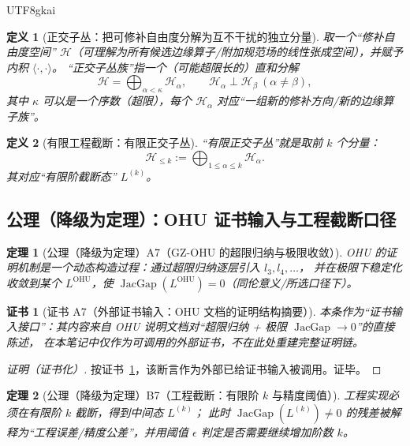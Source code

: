 \documentclass[12pt]{article}
\newtheorem{definition}{定义}[section]
\newtheorem{theorem}{定理}[section]
\newtheorem{Certificate}{证书}[section]
\newcommand{\JacGap}{\operatorname{JacGap}}
\begin{document}
\begin{CJK*}{UTF8}{gkai}
\begin{definition}[正交子丛：把可修补自由度分解为互不干扰的独立分量]
\label{def:tex27-ch7-d2}
取一个“修补自由度空间” $\mathcal{H}$（可理解为所有候选边缘算子/附加规范场的线性张成空间），并赋予内积 $\langle\cdot,\cdot\rangle$。
“正交子丛族”指一个（可能超限长的）直和分解
\[
  \mathcal{H}=\bigoplus_{\alpha<\kappa}\mathcal{H}_\alpha,
  \qquad
  \mathcal{H}_\alpha\perp \mathcal{H}_\beta\ (\alpha\neq\beta),
\]
其中 $\kappa$ 可以是一个序数（超限），每个 $\mathcal{H}_\alpha$ 对应“一组新的修补方向/新的边缘算子族”。
\end{definition}

\begin{definition}[有限工程截断：有限正交子丛]
\label{def:tex27-ch7-d3}
“有限正交子丛”就是取前 $k$ 个分量：
\[
  \mathcal{H}_{\le k}:=\bigoplus_{1\le \alpha\le k}\mathcal{H}_\alpha.
\]
其对应“有限阶截断态” $L^{(k)}$。
\end{definition}

\subsection{公理（降级为定理）：OHU 证书输入与工程截断口径}
\label{subsec:tex27-ch7-axioms}

\begin{theorem}[公理（降级为定理）A7（GZ-OHU 的超限归纳与极限收敛）]
\label{thm:tex27-ch7-a7}
OHU 的证明机制是一个动态构造过程：通过超限归纳逐层引入 $l_3,l_4,\dots$，
并在极限下稳定化收敛到某个 $L^{\mathrm{OHU}}$，使 $\JacGap(L^{\mathrm{OHU}})=0$（同伦意义/所选口径下）。
\end{theorem}

\begin{Certificate}[证书 A7（外部证书输入：OHU 文档的证明结构摘要）]
\label{cert:tex27-ch7-a7}
本条作为“证书输入接口”：其内容来自 OHU 说明文档对“超限归纳 + 极限 $\JacGap\to 0$”的直接陈述，
在本笔记中仅作为可调用的外部证书，不在此处重建完整证明链。
\cite{GaoZheng2025GFramework}
\end{Certificate}

\begin{proof}[证明（证书化）]
按证书~\ref{cert:tex27-ch7-a7}，该断言作为外部已给证书输入被调用。证毕。
\end{proof}

\begin{theorem}[公理（降级为定理）B7（工程截断：有限阶 $k$ 与精度阈值）]
\label{thm:tex27-ch7-b7}
工程实现必须在有限阶 $k$ 截断，得到中间态 $L^{(k)}$；
此时 $\JacGap(L^{(k)})\neq 0$ 的残差被解释为“工程误差/精度公差”，并用阈值 $\epsilon$ 判定是否需要继续增加阶数 $k$。
\end{theorem}


\end{CJK*}
\end{document}
